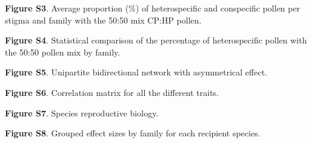 \documentclass[12pt,]{article}
\begin{document}
\textbf{Figure S3}. Average proportion (\%) of heterospecific and
conspecific pollen per stigma and family with the 50:50 mix CP:HP
pollen.

\textbf{Figure S4}. Statistical comparison of the percentage of
heterospecific pollen with the 50:50 pollen mix by family.

\textbf{Figure S5}. Unipartite bidirectional network with asymmetrical
effect.

\textbf{Figure S6}. Correlation matrix for all the different traits.

\textbf{Figure S7}. Species reproductive biology.

\textbf{Figure S8}. Grouped effect sizes by family for each recipient
species.

\newpage

\begingroup\fontsize{10}{12}\selectfont
\end{document}
